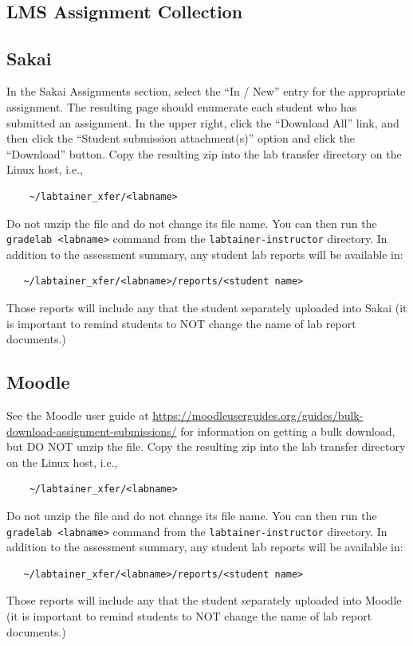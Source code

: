 \documentclass[12pt]{article}
\begin{document}
\begin{appendices}
{}
\setcounter{page}{3}
\section{\\LMS Assignment Collection}
\label{lms collection}
\subsection{Sakai}
In the Sakai Assignments section, select the ``In / New'' entry for the appropriate assignment.
The resulting page should enumerate each student who has submitted an assignment.  In the upper right,
click the ``Download All'' link, and then click the ``Student submission attachment(s)'' option and
click the ``Download'' button.  Copy the resulting zip into the lab transfer directory 
on the Linux host, i.e.,
\begin{verbatim}
    ~/labtainer_xfer/<labname>
\end{verbatim}
\noindent Do not unzip the file and do not change its file name.
You can then run the {\tt gradelab <labname>} command from the {\tt labtainer-instructor} directory.
In addition to the assessment summary, any student lab reports will be available in:
\begin{verbatim}
   ~/labtainer_xfer/<labname>/reports/<student name> 
\end{verbatim}
\noindent Those reports will include any that the student separately uploaded into Sakai (it is 
important to remind students to NOT change the name of lab report documents.)

\subsection{Moodle}
See the Moodle user guide at 
\newline
\url{https://moodleuserguides.org/guides/bulk-download-assignment-submissions/}
for information on getting a bulk download, but DO NOT unzip the file.  Copy the resulting zip into the lab transfer directory 
on the Linux host, i.e.,
\begin{verbatim}
    ~/labtainer_xfer/<labname>
\end{verbatim}
\noindent Do not unzip the file and do not change its file name.
You can then run the {\tt gradelab <labname>} command from the {\tt labtainer-instructor} directory.
In addition to the assessment summary, any student lab reports will be available in:
\begin{verbatim}
   ~/labtainer_xfer/<labname>/reports/<student name> 
\end{verbatim}
\noindent Those reports will include any that the student separately uploaded into Moodle (it is 
important to remind students to NOT change the name of lab report documents.)


\end{appendices}
\end{document}
